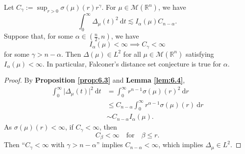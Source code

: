 \begin{theorem}\label{thm:6.5}
Let $\displaystyle C_{\gamma}:=\sup_{r>0}\sigma(\mu)(r)r^{\gamma}$. For $\mu \in \mathcal{M}(\mathbb{R}^{n})$, we have
$$
\int _{0}^{\infty}\Delta _{\mu}(t)^{2}\ \mathrm{d}t\lesssim I_{\alpha}(\mu)C_{n-\alpha}.
$$
Suppose that, for some $\alpha \in\left( \frac{n}{2},n \right)$, we have
$$
I_{\alpha}(\mu)<\infty\implies C_{\gamma}<\infty
$$
for some $\gamma>n-\alpha$. Then $\Delta(\mu)\in L^{2}$ for all $\mu \in \mathcal{M}(\mathbb{R}^{n})$ satisfying $I_{\alpha}(\mu)<\infty$. In particular, Falconer's distance set conjecture is true for $\alpha$.
\end{theorem}
\begin{proof}
By \textbf{Proposition \ref{prop:6.3}} and \textbf{Lemma \ref{lem:6.4}},
$$
\begin{aligned}
\int _{0}^{\infty}\lvert \Delta _{\mu}(t) \rvert ^{2}\ \mathrm{d}t & =\int _{0}^{\infty}r^{n-1}\sigma(\mu)(r)^{2}\ \mathrm{d}r \\
& \leq C_{n-\alpha}\int _{0}^{\infty}r^{\alpha-1}\sigma(\mu)(r)\ \mathrm{d}r \\
& \sim C_{n-\alpha}I_{\alpha}(\mu).
\end{aligned}
$$
As $\sigma(\mu)(r)<\infty$, if $C_{\gamma}<\infty$, then
$$
C_{\beta}<\infty \quad\text{for}\quad \beta\leq r.
$$
Then ``$C_{\gamma}<\infty$ with $\gamma>n-\alpha$'' implies $C_{n-\alpha}<\infty$, which implies $\Delta _{\mu}\in L^{2}$.
\end{proof}